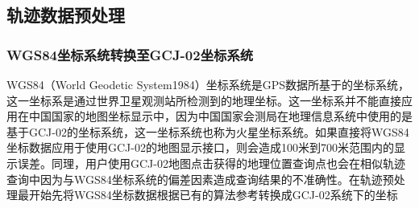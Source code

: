 




\subsection{轨迹数据预处理}
\label{subsec:preprocess}

\subsubsection{WGS84坐标系统转换至GCJ-02坐标系统}
\label{subsubsec:coord-transform}
WGS84（World Geodetic System1984）坐标系统是GPS数据所基于的坐标系统，这一坐标系是通过世界卫星观测站所检测到的地理坐标。这一坐标系并不能直接应用在中国国家的地图坐标显示中，因为中国国家会测局在地理信息系统中使用的是基于GCJ-02的坐标系统，这一坐标系统也称为火星坐标系统。如果直接将WGS84坐标数据应用于使用GCJ-02的地图显示接口，则会造成100米到700米范围内的显示误差。同理，用户使用GCJ-02地图点击获得的地理位置查询点也会在相似轨迹查询中因为与WGS84坐标系统的偏差因素造成查询结果的不准确性。在轨迹预处理最开始先将WGS84坐标数据根据已有的算法\footnotemark[1]参考转换成GCJ-02系统下的坐标


